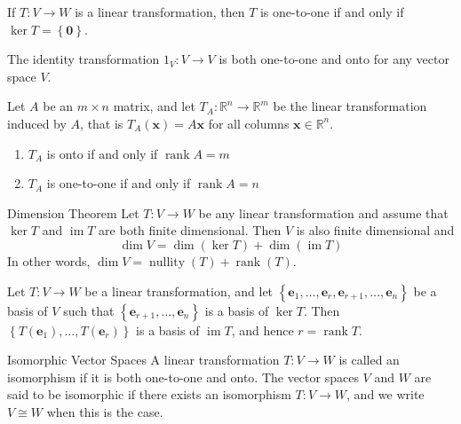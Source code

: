 \documentclass[12pt]{article}
\begin{document}
\begin{theorem}{}{}
    If $ T : V \to W $ is a linear transformation, then $ T $ is one-to-one if and only if $ \ker T = \left\{ \mathbf{0} \right\} $.
\end{theorem}

\begin{note}{}{}
    The identity transformation $ 1_V : V \to V $ is both one-to-one and onto for any vector space $ V $.
\end{note}

\begin{theorem}{}{}
    Let $ A $ be an $ m \times n $ matrix, and let $ T_A : \mathbb{R}^n \to \mathbb{R}^m $ be the linear transformation induced by $ A $, that is $ T_A \left( \mathbf{x} \right) = A \mathbf{x} $ for all columns $ \mathbf{x} \in \mathbb{R}^n $.
    \begin{enumerate}[label=(\roman*)]
        \item $ T_A $ is onto if and only if $ \operatorname{rank} A = m $
        \item $ T_A $ is one-to-one if and only if $ \operatorname{rank} A = n $
    \end{enumerate}
\end{theorem}

\begin{theorem}{Dimension Theorem}{}
    Let $ T : V \to W $ be any linear transformation and assume that $ \ker T $ and $ \operatorname{im} T $ are both finite dimensional. Then $ V $ is also finite dimensional and
    \[ \dim V = \dim \left( \ker T \right) + \dim \left( \operatorname{im} T \right) \]
    In other words, $ \dim V = \operatorname{nullity} \left( T \right) + \operatorname{rank} \left( T \right) $.
\end{theorem}

\begin{theorem}{}{}
    Let $ T : V \to W $ be a linear transformation, and let $ \left\{ \mathbf{e}_1, \dots, \mathbf{e}_r, \mathbf{e}_{r+1}, \dots, \mathbf{e}_n \right\} $ be a basis of $ V $ such that $ \left\{ \mathbf{e}_{r+1}, \dots, \mathbf{e}_n \right\} $ is a basis of $ \ker T $. Then $ \left\{ T \left( \mathbf{e}_1 \right), \dots, T \left( \mathbf{e}_r \right) \right\} $ is a basis of $ \operatorname{im} T $, and hence $ r = \operatorname{rank} T $.
\end{theorem}

\begin{definition}{Isomorphic Vector Spaces}{}
    A linear transformation $ T : V \to W $ is called an isomorphism if it is both one-to-one and onto. The vector spaces $ V $ and $ W $ are said to be isomorphic if there exists an isomorphism $ T : V \to W $, and we write $ V \cong W $ when this is the case.
\end{definition}
\end{document}
